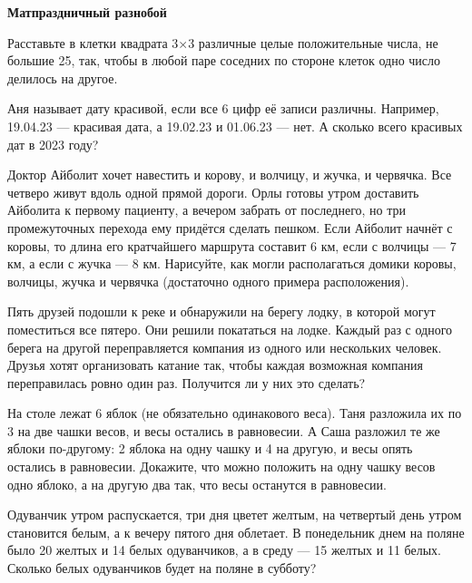 \centerline{\bf \Huge Матпраздничный разнобой}

\begin{flushright}
        \scriptsize{}
\end{flushright}

Расставьте в клетки квадрата 3×3 различные целые положительные числа, не большие 25, так, чтобы в любой паре соседних по стороне клеток одно число делилось на другое.

Аня называет дату красивой, если все 6 цифр её записи различны. Например, 19.04.23 — красивая дата, а 19.02.23 и 01.06.23 — нет. А сколько всего красивых дат в 2023 году?

Доктор Айболит хочет навестить и корову, и волчицу, и жучка, и червячка. Все четверо живут вдоль одной прямой дороги. Орлы готовы утром доставить Айболита к первому пациенту, а вечером забрать от последнего, но три промежуточных перехода ему придётся сделать пешком. Если Айболит начнёт с коровы, то длина его кратчайшего маршрута составит 6 км, если с волчицы — 7 км, а если с жучка — 8 км. Нарисуйте, как могли располагаться домики коровы, волчицы, жучка и червячка (достаточно одного примера расположения).

Пять друзей подошли к реке и обнаружили на берегу лодку, в которой могут поместиться все пятеро. Они решили покататься на лодке. Каждый раз с одного берега на другой переправляется компания из одного или нескольких человек. Друзья хотят организовать катание так, чтобы каждая возможная компания переправилась ровно один раз. Получится ли у них это сделать?

На столе лежат 6 яблок (не обязательно одинакового веса). Таня разложила их по 3 на две чашки весов, и весы остались в равновесии. А Саша разложил те же яблоки по-другому: 2 яблока на одну чашку и 4 на другую, и весы опять остались в равновесии. Докажите, что можно положить на одну чашку весов одно яблоко, а на другую два так, что весы останутся в равновесии.

Одуванчик утром распускается, три дня цветет желтым, на четвертый день утром становится белым, а к вечеру пятого дня облетает. В понедельник днем на поляне было 20 желтых и 14 белых одуванчиков, а в среду — 15 желтых и 11 белых. Сколько белых одуванчиков будет на поляне в субботу?